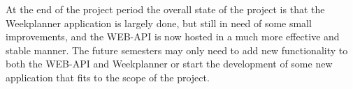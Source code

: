 At the end of the project period the overall state of the project is that the Weekplanner application is largely done, but still in need of some small improvements, and the WEB-API is now hosted in a much more effective and stable manner. 
The future semesters may only need to add new functionality to both the WEB-API and Weekplanner or start the development of some new application that fits to the scope of the project.


\newpage
